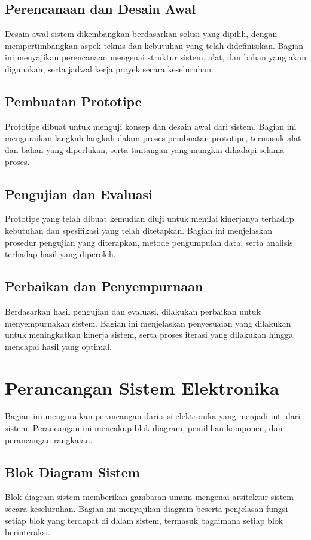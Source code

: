 \subsection{Perencanaan dan Desain Awal}
Desain awal sistem dikembangkan berdasarkan solusi yang dipilih, dengan mempertimbangkan aspek teknis dan kebutuhan yang telah didefinisikan. Bagian ini menyajikan perencanaan mengenai struktur sistem, alat, dan bahan yang akan digunakan, serta jadwal kerja proyek secara keseluruhan.

\subsection{Pembuatan Prototipe}
Prototipe dibuat untuk menguji konsep dan desain awal dari sistem. Bagian ini menguraikan langkah-langkah dalam proses pembuatan prototipe, termasuk alat dan bahan yang diperlukan, serta tantangan yang mungkin dihadapi selama proses.

\subsection{Pengujian dan Evaluasi}
Prototipe yang telah dibuat kemudian diuji untuk menilai kinerjanya terhadap kebutuhan dan spesifikasi yang telah ditetapkan. Bagian ini menjelaskan prosedur pengujian yang diterapkan, metode pengumpulan data, serta analisis terhadap hasil yang diperoleh.

\subsection{Perbaikan dan Penyempurnaan}
Berdasarkan hasil pengujian dan evaluasi, dilakukan perbaikan untuk menyempurnakan sistem. Bagian ini menjelaskan penyesuaian yang dilakukan untuk meningkatkan kinerja sistem, serta proses iterasi yang dilakukan hingga mencapai hasil yang optimal.

\section{Perancangan Sistem Elektronika}
Bagian ini menguraikan perancangan dari sisi elektronika yang menjadi inti dari sistem. Perancangan ini mencakup blok diagram, pemilihan komponen, dan perancangan rangkaian.

\subsection{Blok Diagram Sistem}
Blok diagram sistem memberikan gambaran umum mengenai arsitektur sistem secara keseluruhan. Bagian ini menyajikan diagram beserta penjelasan fungsi setiap blok yang terdapat di dalam sistem, termasuk bagaimana setiap blok berinteraksi.


